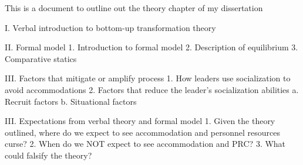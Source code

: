 This is a document to outline out the theory chapter of my dissertation

I. Verbal introduction to bottom-up transformation theory

II. Formal model %
    1. Introduction to formal model
    2. Description of equilibrium
    3. Comparative statics
    
III. Factors that mitigate or amplify process
    1. How leaders use socialization to avoid accommodations
    2. Factors that reduce the leader's socialization abilities
        a. Recruit factors
        b. Situational factors

III. Expectations from verbal theory and formal model
    1. Given the theory outlined, where do we expect to see accommodation and personnel resources curse?
    2. When do we NOT expect to see  accommodation and PRC?
    3. What could falsify the theory?
    
    
    